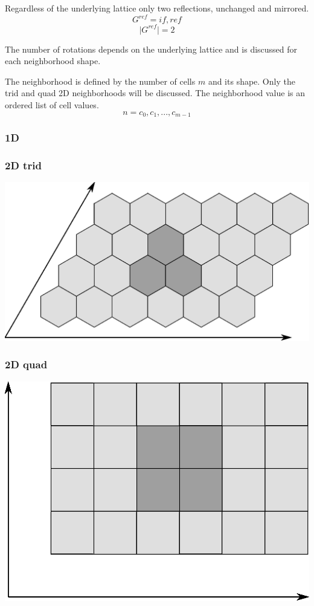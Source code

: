 \documentclass{ijuc}
\begin{document}
Regardless of the underlying lattice only two reflections, unchanged and mirrored.
\[ G^{ref} = {if, ref} \]
\[ \vert G^{ref} \vert = 2 \]

The number of rotations depends on the underlying lattice and is discussed for each neighborhood shape.

The neighborhood is defined by the number of cells \(m\) and its shape.
Only the trid and quad 2D neighborhoods will be discussed.
The neighborhood value is an ordered list of cell values.
\[ n = c_0, c_1, ..., c_{m-1} \]

\subsubsection{1D}

\subsubsection{2D trid}

\includegraphics[scale=0.5]{trid.eps}

\subsubsection{2D quad}

\includegraphics[scale=0.5]{quad.eps}
\end{document}
